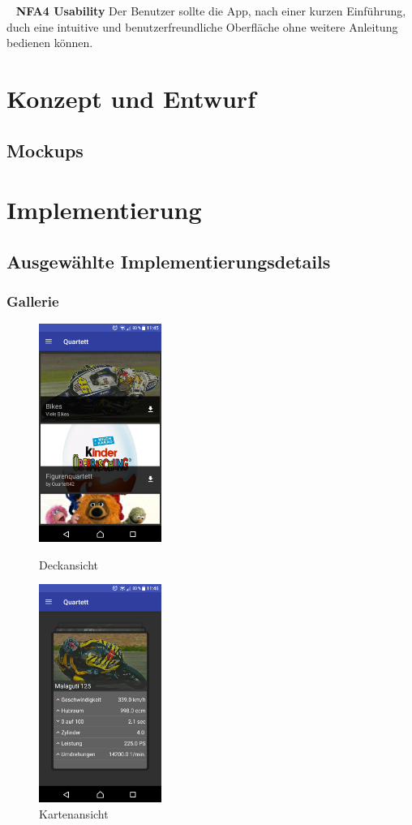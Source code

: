 \documentclass{scrartcl}
\begin{document}
\ \newline
\textbf{NFA4 Usability} \newline
Der Benutzer sollte die App, nach einer kurzen Einführung, duch eine intuitive
und benutzerfreundliche Oberfläche ohne weitere Anleitung bedienen können.

\section{Konzept und Entwurf}
\subsection{Mockups}

\section{Implementierung}
\subsection{Ausgewählte Implementierungsdetails}
\subsubsection{Gallerie}

\begin{figure}
  \centering
  \begin{minipage}{0.45\textwidth}
    \centering
    \includegraphics[width=4cm]{img/gallery_decks.png}
    \caption{Deckansicht}
  \end{minipage}
  \hfill
  \begin{minipage}{0.45\textwidth}
    \centering
    \includegraphics[width=4cm]{img/gallery_cards.png}
    \caption{Kartenansicht}
  \end{minipage}
\end{figure}
\end{document}
